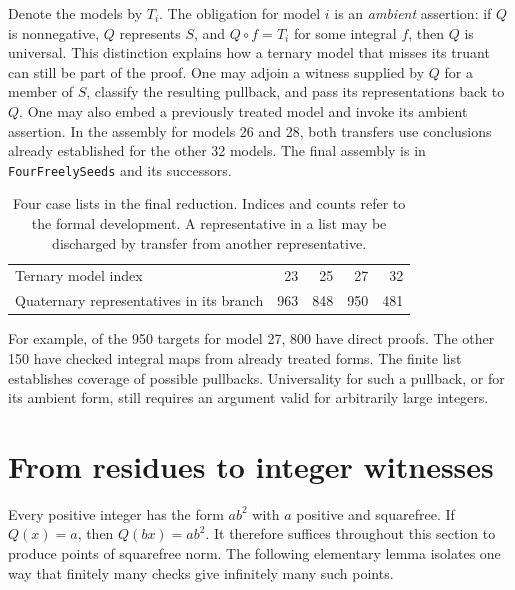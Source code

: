 \documentclass[11pt,a4paper]{article}
\newcommand{\code}[1]{\texttt{#1}}
\begin{document}
Denote the models by $T_i$. The obligation for model $i$ is an
\emph{ambient} assertion: if $Q$ is nonnegative, $Q$ represents $S$, and
$Q\circ f=T_i$ for some integral $f$, then $Q$ is universal. This
distinction explains how a ternary model that misses its truant can
still be part of the proof. One may adjoin a witness supplied by $Q$ for
a member of $S$, classify the resulting pullback, and pass its
representations back to $Q$. One may also embed a previously treated model
and invoke its ambient assertion. In the assembly for models 26 and 28,
both transfers use conclusions already established for the other 32
models. The final assembly is in \code{FourFreelySeeds} and its successors.

\begin{table}[ht]
\centering
\begin{tabular}{lrrrr}
\toprule
Ternary model index & 23 & 25 & 27 & 32\\
Quaternary representatives in its branch & 963 & 848 & 950 & 481\\
\bottomrule
\end{tabular}
\caption{Four case lists in the final reduction. Indices and counts refer
to the formal development. A representative in a list may be discharged
by transfer from another representative.}\label{tab:cases}
\end{table}
For example, of the 950 targets for model 27, 800 have direct proofs.
The other 150 have checked integral maps from already treated forms.
The finite list establishes coverage of possible pullbacks. Universality
for such a pullback, or for its ambient form, still requires an argument
valid for arbitrarily large integers.

\section{From residues to integer witnesses}
Every positive integer has the form $a b^2$ with $a$ positive and
squarefree. If $Q(x)=a$, then $Q(bx)=a b^2$. It therefore suffices
throughout this section to produce points of squarefree norm.
The following elementary lemma isolates one way that finitely many
checks give infinitely many such points.
\end{document}
